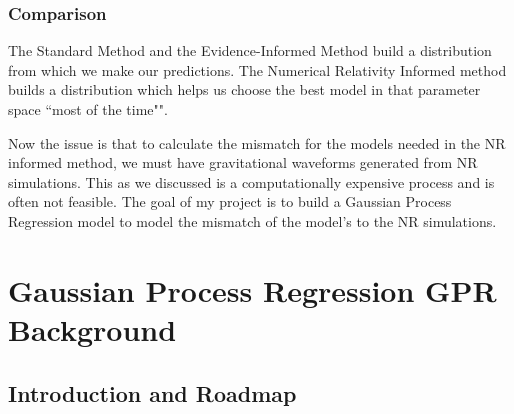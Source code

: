 \documentclass[11pt]{article}
\begin{document}
\subsubsection*{Comparison}
The Standard Method and the Evidence-Informed Method build a distribution from which we make our predictions. The Numerical Relativity Informed method builds a distribution which helps us choose the best model in that parameter space ``most of the time"".

\noindent
Now the issue is that to calculate the mismatch for the models needed in the NR informed method, we must have gravitational waveforms generated from NR simulations. This as we discussed is a computationally expensive process and is often not feasible. The goal of my project is to build a Gaussian Process Regression model to model the mismatch of the model's to the NR simulations.

\section{Gaussian Process Regression \textbf{GPR} Background}
\subsection{Introduction and Roadmap}
\end{document}
